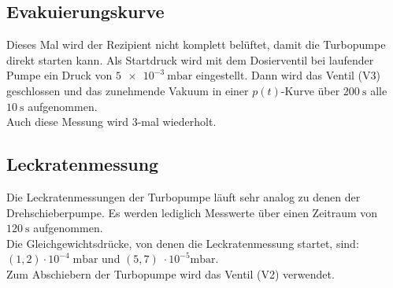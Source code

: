 		\subsection{Evakuierungskurve}

			Dieses Mal wird der Rezipient nicht komplett belüftet, damit die Turbopumpe direkt starten kann. 
			Als Startdruck  wird mit dem Dosierventil bei laufender Pumpe ein Druck von $\SI{5e-3}{\milli\bar}$ eingestellt.
			Dann wird das Ventil (V3) geschlossen und das zunehmende Vakuum in einer $p(t)$-Kurve über $\SI{200}{\second}$ alle $\SI{10}{\second}$ aufgenommen.\\
			Auch diese Messung wird 3-mal wiederholt.

		\subsection{Leckratenmessung}

			Die Leckratenmessungen der Turbopumpe läuft sehr analog zu denen der Drehschieberpumpe. 
			Es werden lediglich Messwerte über einen Zeitraum von $\SI{120}{\second}$ aufgenommen.\\ 
			Die Gleichgewichtsdrücke, von denen die Leckratenmessung startet, sind: $(1, 2)\cdot10^{-4} \; \si{\milli\bar}$ und $(5, 7)\; \cdot10^{-5}\si{\milli\bar}$.\\
			Zum Abschiebern der Turbopumpe wird das Ventil (V2) verwendet.
